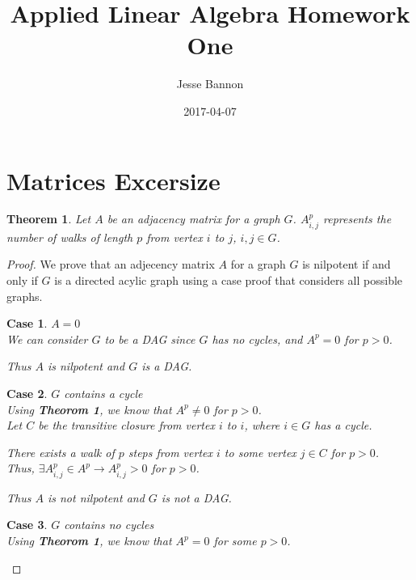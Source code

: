 \documentclass{article}
\title{Applied Linear Algebra Homework One}
\date{2017-04-07}
\author{Jesse Bannon}
\theoremstyle{plain}
\newtheorem{theorem}{Theorem}
\newtheorem{case}{Case}
\theoremstyle{nonumberplain}
\newtheorem{proof}{Proof}
\begin{document}
\maketitle
  \section{Matrices Excersize}
  
  \begin{theorem}
  Let $A$ be an adjacency matrix for a graph $G$. $A_{i,j}^p$ represents the number of walks of length $p$ from vertex $i$ to $j$, $i, j \in G$.
  \end{theorem}
  
  \begin{proof}
        We prove that an adjecency matrix $A$ for a graph $G$ is nilpotent if and only if $G$ is a directed acylic graph using a case proof that considers all possible graphs.
        \begin{case}
        	$A = 0$ \\
        	
        	We can consider $G$ to be a DAG since $G$ has no cycles, and $A^p = 0$ for $p > 0$.
        	
        	Thus $A$ is nilpotent and $G$ is a DAG.
        \end{case}
        
        \begin{case}
        	$G$ contains a cycle \\
        	
        	Using \textbf{Theorom 1}, we know that $A^p \neq 0$ for $p > 0$. \\

        	Let $C$ be the transitive closure from vertex $i$ to $i$, where $i \in G$ has a cycle.
        	
			There exists a walk of $p$ steps from vertex $i$ to some vertex $j \in C$ for $p > 0$. \\

        	Thus, $\exists A_{i,j}^p \in A^p \to A_{i,j}^p > 0$ for $p > 0$. 
        	
        	Thus $A$ is not nilpotent and $G$ is not a DAG.
        \end{case}
        
        \begin{case}
        $G$ contains no cycles \\
        
        Using \textbf{Theorom 1}, we know that $A^p = 0$ for some $p > 0$.
        

\end{case}
\end{proof}
\end{document}
